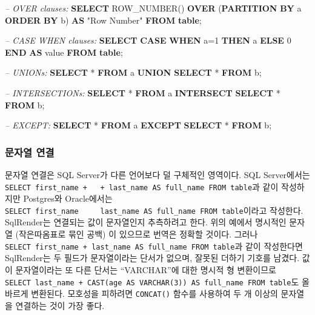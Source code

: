 \documentclass[10.5pt]{book}
\newenvironment{Shaded}{\begin{snugshade}}{\end{snugshade}}
\newcommand{\KeywordTok}[1]{\textcolor[rgb]{0.13,0.29,0.53}{\textbf{#1}}}
\newcommand{\DecValTok}[1]{\textcolor[rgb]{0.00,0.00,0.81}{#1}}
\newcommand{\CommentTok}[1]{\textcolor[rgb]{0.56,0.35,0.01}{\textit{#1}}}
\newcommand{\OtherTok}[1]{\textcolor[rgb]{0.56,0.35,0.01}{#1}}
\newcommand{\FunctionTok}[1]{\textcolor[rgb]{0.00,0.00,0.00}{#1}}
\newcommand{\NormalTok}[1]{#1}
\theoremstyle{definition}
\theoremstyle{definition}
\theoremstyle{definition}
\theoremstyle{remark}
\begin{document}
\begin{Shaded}
\begin{Highlighting}[]
\CommentTok{-- OVER clauses:}
\KeywordTok{SELECT} \FunctionTok{ROW_NUMBER}\NormalTok{() }\KeywordTok{OVER}\NormalTok{ (}\KeywordTok{PARTITION} \KeywordTok{BY}\NormalTok{ a }\KeywordTok{ORDER} \KeywordTok{BY}\NormalTok{ b)}
  \KeywordTok{AS} \OtherTok{"Row Number"} \KeywordTok{FROM} \KeywordTok{table}\NormalTok{;}
  
\CommentTok{-- CASE WHEN clauses:}
\KeywordTok{SELECT} \KeywordTok{CASE} \KeywordTok{WHEN}\NormalTok{ a=}\DecValTok{1} \KeywordTok{THEN}\NormalTok{ a }\KeywordTok{ELSE} \DecValTok{0} \KeywordTok{END} \KeywordTok{AS} \FunctionTok{value} \KeywordTok{FROM} \KeywordTok{table}\NormalTok{;}

\CommentTok{-- UNIONs:}
\KeywordTok{SELECT}\NormalTok{ * }\KeywordTok{FROM}\NormalTok{ a }\KeywordTok{UNION} \KeywordTok{SELECT}\NormalTok{ * }\KeywordTok{FROM}\NormalTok{ b;}

\CommentTok{-- INTERSECTIONs:}
\KeywordTok{SELECT}\NormalTok{ * }\KeywordTok{FROM}\NormalTok{ a }\KeywordTok{INTERSECT} \KeywordTok{SELECT}\NormalTok{ * }\KeywordTok{FROM}\NormalTok{ b;}

\CommentTok{-- EXCEPT:}
\KeywordTok{SELECT}\NormalTok{ * }\KeywordTok{FROM}\NormalTok{ a }\KeywordTok{EXCEPT} \KeywordTok{SELECT}\NormalTok{ * }\KeywordTok{FROM}\NormalTok{ b;}
\end{Highlighting}
\end{Shaded}

\subsubsection*{문자열 연결}\label{-}

문자열 연결은 SQL Server가 다른 언어보다 덜 구체적인 영역이다. SQL
Server에서는
\texttt{SELECT\ first\_name\ +\ \textquotesingle{}\ \textquotesingle{}\ +\ last\_name\ AS\ full\_name\ FROM\ table}과
같이 작성하지만 Postgres와 Oracle에서는
\texttt{SELECT\ first\_name\ \textbar{}\textbar{}\ \textquotesingle{}\ \textquotesingle{}\ \textbar{}\textbar{}\ last\_name\ AS\ full\_name\ FROM\ table}이라고
작성한다. SqlRender는 연결되는 값이 문자열인지 추측하려고 한다. 위의
예에서 명시적인 문자열 (작은따옴표로 묶인 공백) 이 있으므로 번역은
정확할 것이다. 그러나
\texttt{SELECT\ first\_name\ +\ last\_name\ AS\ full\_name\ FROM\ table}과
같이 작성한다면 SqlRender는 두 필드가 문자열이라는 단서가 없으며, 잘못된
더하기 기호를 남겼다. 값이 문자열이라는 또 다른 단서는 ``VARCHAR''에
대한 명시적 형 변환이므로
\texttt{SELECT\ last\_name\ +\ CAST(age\ AS\ VARCHAR(3))\ AS\ full\_name\ FROM\ table}도
올바르게 변환된다. 모호성을 피하려면 \texttt{CONCAT()} 함수를 사용하여
두 개 이상의 문자열을 연결하는 것이 가장 좋다.
\end{document}
